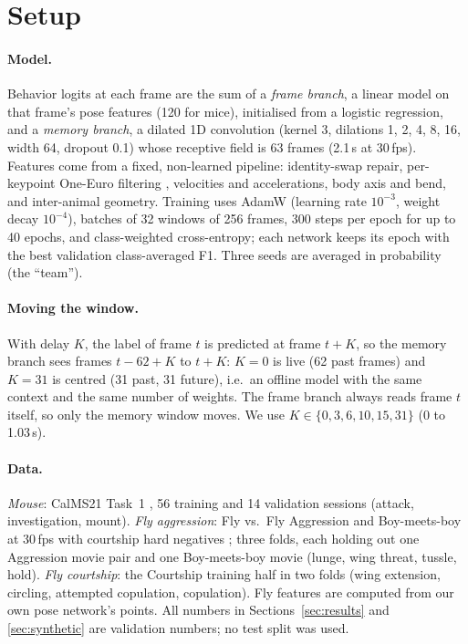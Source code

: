 \documentclass[10pt]{article}
\begin{document}
\section{Setup}
\label{sec:setup}

\paragraph{Model.} Behavior logits at each frame are the sum of a \emph{frame branch}, a linear model on that frame's pose features (120 for mice), initialised from a logistic regression, and a \emph{memory branch}, a dilated 1D convolution (kernel 3, dilations 1, 2, 4, 8, 16, width 64, dropout 0.1) whose receptive field is 63 frames (2.1\,s at 30\,fps). Features come from a fixed, non-learned pipeline: identity-swap repair, per-keypoint One-Euro filtering \citep{casiez2012oneeuro}, velocities and accelerations, body axis and bend, and inter-animal geometry. Training uses AdamW (learning rate $10^{-3}$, weight decay $10^{-4}$), batches of 32 windows of 256 frames, 300 steps per epoch for up to 40 epochs, and class-weighted cross-entropy; each network keeps its epoch with the best validation class-averaged F1. Three seeds are averaged in probability (the ``team'').

\paragraph{Moving the window.} With delay $K$, the label of frame $t$ is predicted at frame $t+K$, so the memory branch sees frames $t-62+K$ to $t+K$: $K=0$ is live (62 past frames) and $K=31$ is centred (31 past, 31 future), i.e.\ an offline model with the same context and the same number of weights. The frame branch always reads frame $t$ itself, so only the memory window moves. We use $K \in \{0,3,6,10,15,31\}$ (0 to 1.03\,s).

\paragraph{Data.} \emph{Mouse}: CalMS21 Task~1 \citep{sun2021calms21}, 56 training and 14 validation sessions (attack, investigation, mount). \emph{Fly aggression}: Fly vs.\ Fly Aggression and Boy-meets-boy at 30\,fps with courtship hard negatives \citep{eyjolfsdottir2014flyvsfly}; three folds, each holding out one Aggression movie pair and one Boy-meets-boy movie (lunge, wing threat, tussle, hold). \emph{Fly courtship}: the Courtship training half in two folds (wing extension, circling, attempted copulation, copulation). Fly features are computed from our own pose network's points. All numbers in Sections~\ref{sec:results} and \ref{sec:synthetic} are validation numbers; no test split was used.
\end{document}
